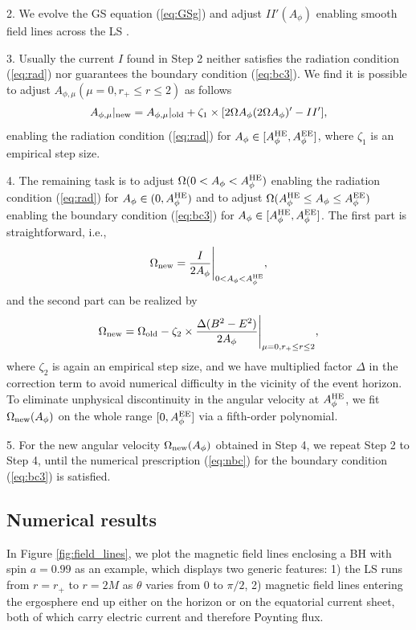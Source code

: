 \documentclass[aps,prd,reprint,nofootinbib, superscriptaddress]{revtex4-1}
\def\Ap{A_\phi}
\def\Am{A_{\phi,\mu}}
\def\be{\begin{equation}}
\def\ee{\end{equation}}
\def\AHE{A_\phi^{\rm HE}}
\def\AEE{A_\phi^{\rm EE}}
\begin{document}
2. We evolve the GS equation (\ref{eq:GSg}) and adjust $II'(\Ap)$ enabling smooth field lines across the LS
\cite[see e.g.][for details]{Contopoulos2013, Nathanail2014, Pan2016a, Mahlmann2018}.

3. Usually the current $I$ found in Step 2 neither satisfies the radiation condition (\ref{eq:rad})
nor guarantees the boundary condition (\ref{eq:bc3}). We find it is possible to adjust
$\Am(\mu = 0, r_+ \leq r\leq 2)$ as follows
\be
 A_{\phi,\mu}|_{\rm new}  = A_{\phi,\mu}|_{\rm old} + \zeta_1\times[2\Omega\Ap(2\Omega\Ap)' -II'],
\ee
enabling the radiation condition (\ref{eq:rad}) for
$A_\phi\in [A_\phi^{\rm HE}, A_\phi^{\rm EE}]$, where $\zeta_1$ is an
empirical step size.

4. The remaining task is to adjust  $\Omega(0< \Ap < \AHE)$ enabling  the radiation condition (\ref{eq:rad})
 for $A_\phi \in (0, A_\phi^{\rm HE})$ and  to adjust $\Omega(\AHE \leq \Ap \leq \AEE)$
 enabling the boundary condition (\ref{eq:bc3}) for $\Ap \in [\AHE, \AEE]$.
 The first part is straightforward, i.e.,
 \be
\Omega_{\rm new} = \frac{I}{2\Ap}\Bigg|_{0 < \Ap < \AHE},
 \ee
 and the second part can be realized by
 \be
\Omega_{\rm new}  = \Omega_{\rm old} - \zeta_2\times\frac{\Delta (B^2-E^2)}{2\Ap}\Bigg|_{\mu=0, r_+\leq r \leq 2},
 \ee
 where $\zeta_2$ is again an empirical step size, and we have multiplied factor $\Delta$
 in the correction term to avoid numerical difficulty in the vicinity of the event horizon.
 To eliminate unphysical discontinuity in the angular
 velocity at $\AHE$, we fit $\Omega_{\rm new}(\Ap)$ on the whole range
 $[0, \AEE]$ via a fifth-order polynomial.

 5. For the new angular velocity $\Omega_{\rm new}(\Ap)$ obtained in Step 4, we repeat Step 2 to Step 4,
 until the numerical prescription (\ref{eq:nbc}) for the boundary condition (\ref{eq:bc3}) is satisfied.

\subsection{Numerical results}

In Figure \ref{fig:field_lines}, we plot the magnetic field lines enclosing a BH with spin $a =0.99$ as an example,
which displays two generic features: 1) the LS runs from $r=r_+$ to $r=2M$ as $\theta$ varies from $0$ to $\pi/2$,
2) magnetic field lines entering the ergosphere end up either on the horizon or on the equatorial current sheet,
both of which carry electric current and therefore Poynting flux.
\end{document}
